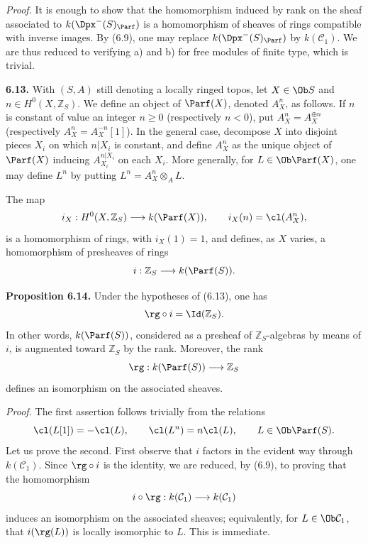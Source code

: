 \providecommand{\End}{\operatorname{End}}
\providecommand{\tr}{\operatorname{tr}}

\emph{Proof.} It is enough to show that the homomorphism induced by rank on the sheaf associated to \(k(\Dpx^-(S)_{\Parf})\) is a homomorphism of sheaves of rings compatible with inverse images. By (6.9), one may replace \(k(\Dpx^-(S)_{\Parf})\) by \(k(\mathcal C_1)\). We are thus reduced to verifying a) and b) for free modules of finite type, which is trivial.

\textbf{6.13.} With \((S,A)\) still denoting a locally ringed topos, let \(X\in\Ob S\) and \(n\in H^0(X,\mathbb Z_S)\). We define an object of \(\Parf(X)\), denoted \(A_X^n\), as follows. If \(n\) is constant of value an integer \(n\geq0\) (respectively \(n<0\)), put \(A_X^n=A_X^{\oplus n}\) (respectively \(A_X^n=A_X^{-n}[1]\)). In the general case, decompose \(X\) into disjoint pieces \(X_i\) on which \(n|X_i\) is constant, and define \(A_X^n\) as the unique object of \(\Parf(X)\) inducing \(A_{X_i}^{n|X_i}\) on each \(X_i\). More generally, for \(L\in\Ob\Parf(X)\), one may define \(L^n\) by putting \(L^n=A_X^n\otimes_A L\).

The map
\[
  i_X:H^0(X,\mathbb Z_S)\longrightarrow k(\Parf(X)),
  \qquad i_X(n)=\cl(A_X^n),
\]
is a homomorphism of rings, with \(i_X(1)=1\), and defines, as \(X\) varies, a homomorphism of presheaves of rings
\[
  i:\mathbb Z_S\longrightarrow k(\Parf(S)).
\]

\textbf{Proposition 6.14.} Under the hypotheses of (6.13), one has
\[
  \rg\circ i=\Id(\mathbb Z_S).
\]
In other words, \(k(\Parf(S))\), considered as a presheaf of \(\mathbb Z_S\)-algebras by means of \(i\), is augmented toward \(\mathbb Z_S\) by the rank. Moreover, the rank
\[
  \rg:k(\Parf(S))\longrightarrow \mathbb Z_S
\]
defines an isomorphism on the associated sheaves.

\emph{Proof.} The first assertion follows trivially from the relations
\[
  \cl(L[1])=-\cl(L),\qquad \cl(L^n)=n\cl(L),
  \qquad L\in\Ob\Parf(S).
\]
Let us prove the second. First observe that \(i\) factors in the evident way through \(k(\mathcal C_1)\). Since \(\rg\circ i\) is the identity, we are reduced, by (6.9), to proving that the homomorphism
\[
  i\circ\rg:k(\mathcal C_1)\longrightarrow k(\mathcal C_1)
\]
induces an isomorphism on the associated sheaves; equivalently, for \(L\in\Ob\mathcal C_1\), that \(i(\rg(L))\) is locally isomorphic to \(L\). This is immediate.

